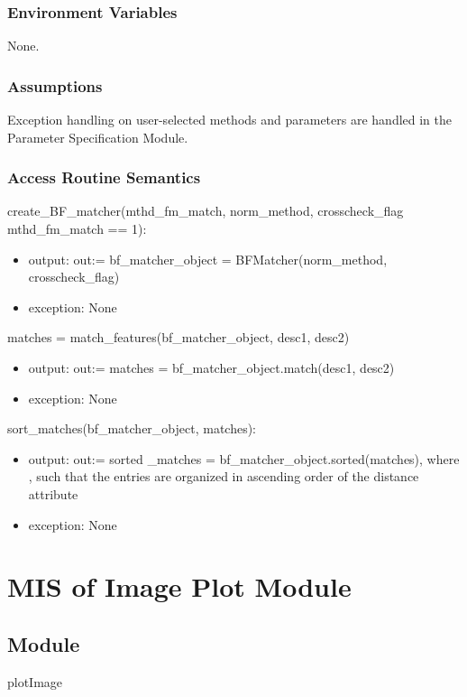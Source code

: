 \documentclass[12pt, titlepage]{article}
\begin{document}
\subsubsection{Environment Variables}

None.

\subsubsection{Assumptions}

Exception handling on user-selected methods and parameters are handled in the Parameter 
Specification Module.

\subsubsection{Access Routine Semantics}
create\_BF\_matcher(mthd\_fm\_match, norm\_method, crosscheck\_flag 
\textbar \: mthd\_fm\_match == 1):
\begin{itemize}
  \item output: out:= bf\_matcher\_object = BFMatcher(norm\_method, 
  crosscheck\_flag) 
  \item exception: None
\end{itemize} 
matches = match\_features(bf\_matcher\_object, desc1, desc2) 
\begin{itemize}
  \item output: out:= matches = bf\_matcher\_object.match(desc1, desc2)
  \item exception: None
\end{itemize}
sort\_matches(bf\_matcher\_object, matches):
\begin{itemize}
  \item output: out:= sorted \_matches = bf\_matcher\_object.sorted(matches), where , such that the entries
  are organized in ascending order of the distance attribute
  \item exception: None
\end{itemize}



\newpage
\section{MIS of Image Plot Module} \label{mIP}
\subsection{Module}
plotImage
\end{document}
